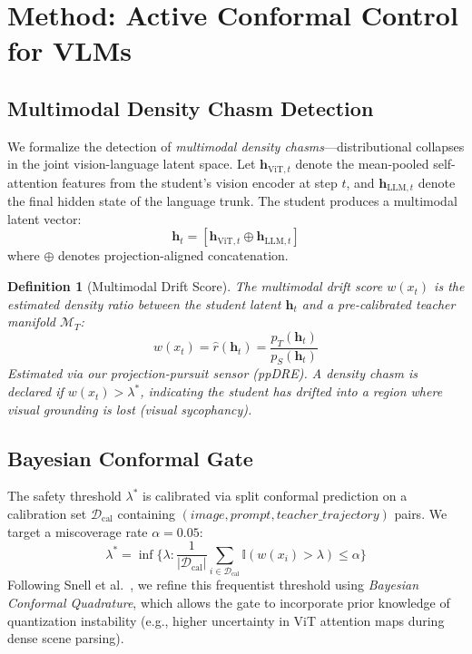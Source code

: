 \documentclass[runningheads]{article} %
\newtheorem{definition}{Definition}
\begin{document}
\section{Method: Active Conformal Control for VLMs}
\label{sec:method}

\subsection{Multimodal Density Chasm Detection}
We formalize the detection of \emph{multimodal density chasms}—distributional collapses in the joint vision-language latent space.
Let $\mathbf{h}_{\text{ViT}, t}$ denote the mean-pooled self-attention features from the student's vision encoder at step $t$, and $\mathbf{h}_{\text{LLM}, t}$ denote the final hidden state of the language trunk. The student produces a multimodal latent vector:
\begin{equation}
  \mathbf{h}_t = [\mathbf{h}_{\text{ViT}, t} \oplus \mathbf{h}_{\text{LLM}, t}]
\end{equation}
where $\oplus$ denotes projection-aligned concatenation.

\begin{definition}[Multimodal Drift Score]
The multimodal drift score $w(x_t)$ is the estimated density ratio between the student latent $\mathbf{h}_t$ and a pre-calibrated teacher manifold $\mathcal{M}_T$:
\begin{equation}
  w(x_t) = \hat{r}(\mathbf{h}_t) = \frac{p_T(\mathbf{h}_t)}{p_S(\mathbf{h}_t)}
\end{equation}
Estimated via our projection-pursuit sensor (ppDRE). A \emph{density chasm} is declared if $w(x_t) > \lambda^*$, indicating the student has drifted into a region where visual grounding is lost (visual sycophancy).
\end{definition}

\subsection{Bayesian Conformal Gate}
The safety threshold $\lambda^*$ is calibrated via split conformal prediction on a calibration set $\mathcal{D}_{\text{cal}}$ containing $(image, prompt, teacher\_trajectory)$ pairs. We target a miscoverage rate $\alpha = 0.05$:
\begin{equation}
  \lambda^* = \inf \{ \lambda : \frac{1}{|\mathcal{D}_{\text{cal}}|} \sum_{i \in \mathcal{D}_{\text{cal}}} \mathbb{I}(w(x_i) > \lambda) \leq \alpha \}
\end{equation}
Following Snell et al.~\cite{snell2025conformal}, we refine this frequentist threshold using \emph{Bayesian Conformal Quadrature}, which allows the gate to incorporate prior knowledge of quantization instability (e.g., higher uncertainty in ViT attention maps during dense scene parsing).
\end{document}
